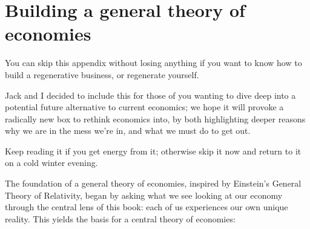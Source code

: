 ﻿\chapter{Building a general theory of economies}
\label{chapter:gen-th-economies-build}


\begin{comment}
Jack comment: our effort to do this parallels the 19th century movement by utilitarians (e.g., Jeremy Bentham) to actualize interpersonal comparisons of utility (i.e., satisfaction). This idea would be worth expanding on in our next book. And perhaps we can use the term interpersonal in one way or another? Lacked the right lenses to look through, didn’t have the comparisons with cubism and general relativity, nor modern understanding of adult development, and so could not see clearly enough what they were pointing at.
\end{comment}


You can skip this appendix without losing anything if you want to know how to build a regenerative business, or regenerate yourself. 


Jack and I decided to include this for those of you wanting to dive deep into a potential future alternative to current economics; we hope it will provoke a radically new box to rethink economics into, by both highlighting deeper reasons why we are in the mess we’re in, and what we must do to get out. 


Keep reading it if you get energy from it; otherwise skip it now and return to it on a cold winter evening. 


The foundation of a general theory of economies,   inspired by Einstein’s General Theory of Relativity, began by asking what we see looking at our economy through the central lens of this book: each of us experiences our own unique reality. This yields the basis for a central theory of economies:


